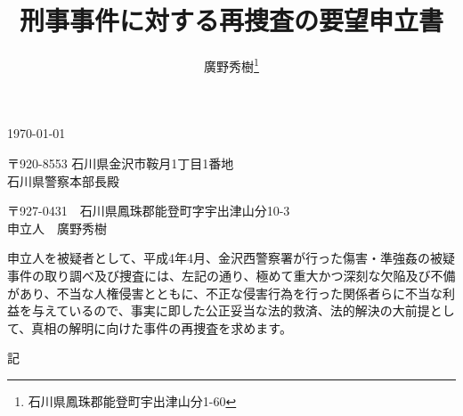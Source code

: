 \documentclass[a4paper,10pt]{jarticle}
\title{刑事事件に対する再捜査の要望申立書}
\author{廣野秀樹\thanks{石川県鳳珠郡能登町宇出津山分1-60}}
\date{}
\begin{document}
\maketitle
\begin{flushright}
\today
\end{flushright}

\begin{flushleft}
〒920-8553 石川県金沢市鞍月1丁目1番地\\
\large{石川県警察本部長殿}\\
\end{flushleft}

\vspace{2.0cm}

\begin{flushright}
〒927-0431　石川県鳳珠郡能登町字宇出津山分10-3\\
申立人　廣野秀樹\\
\end{flushright}
\vspace{1.0cm}

申立人を被疑者として、平成4年4月、金沢西警察署が行った傷害・準強姦の被疑
事件の取り調べ及び捜査には、左記の通り、極めて重大かつ深刻な欠陥及び不備
があり、不当な人権侵害とともに、不正な侵害行為を行った関係者らに不当な利
益を与えているので、事実に即した公正妥当な法的救済、法的解決の大前提とし
て、真相の解明に向けた事件の再捜査を求めます。

\vspace{1.0cm}

\begin{center} 記 \end{center}

\newpage

\setcounter{tocdepth}{4}

\tableofcontents

\newpage
\end{document}
